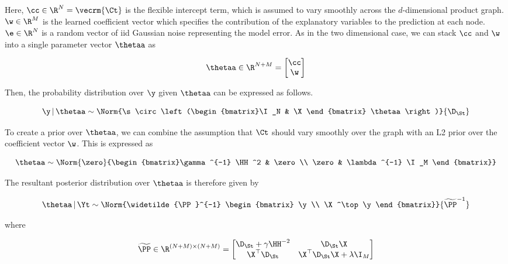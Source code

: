 Here, $\cc \in \R^N = \vecrm{\Ct}$ is the flexible intercept term, which is assumed to vary smoothly across the $d$-dimensional product graph. $\w \in \R^{M}$ is the learned coefficient vector which specifies the contribution of the explanatory variables to the prediction at each node. $\e \in \R^N$ is a random vector of iid Gaussian noise representing the model error. As in the two dimensional case, we can stack $\cc$ and $\w$ into a single parameter vector $\thetaa$ as 

\begin{equation}
    \thetaa \in \R^{N + M} = \begin{bmatrix}
        \cc \\ \w
    \end{bmatrix}
\end{equation}

Then, the probability distribution over $\y$ given $\thetaa$ can be expressed as follows. 

\begin{equation}
    \y \, | \, \thetaa \sim \Norm{\s \circ \left(\begin{bmatrix}\I_N & \X \end{bmatrix} \thetaa \right)}{\D_\St}
\end{equation}

To create a prior over $\thetaa$, we can combine the assumption that $\Ct$ should vary smoothly over the graph with an L2 prior over the coefficient vector $\w$. This is expressed as 

\begin{equation}
    \thetaa \sim \Norm{\zero}{\begin{bmatrix}\gamma^{-1} \HH^2 & \zero \\
    \zero & \lambda^{-1} \I_M \end{bmatrix}}
\end{equation}

The resultant posterior distribution over $\thetaa$ is therefore given by 

\begin{equation}
    \thetaa \, | \, \Yt \sim \Norm{\widetilde{\PP}^{-1} \begin{bmatrix} \y \\ \X^\top \y \end{bmatrix}}{\widetilde{\PP}^{-1}}
\end{equation}

where 

\begin{equation}
    \widetilde{\PP} \in \R^{(N + M) \times (N + M)} = 
    \begin{bmatrix}
     \D_\St + \gamma \HH^{-2} & \D_\St  \X \\
     \X^\top \D_\St & \X^\top \D_\St \X + \lambda \I_M   
    \end{bmatrix}
\end{equation}

